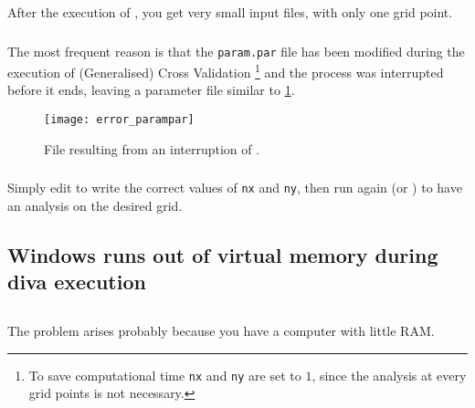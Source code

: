 After the execution of , you get very small input files, with only one grid point.

\subsubsection{\question}

The most frequent reason is that the \texttt{param.par} file has been modified during the execution of (Generalised) Cross Validation \footnote{To save computational time \texttt{nx} and \texttt{ny} are set to $1$, since the analysis at every grid points is not necessary.} and the process was interrupted before it ends, leaving a parameter file similar to \ref{fig:errorparampar}.


\begin{figure}[htpb]
\centering
\texttt{[image: error\_parampar]}
\caption{File  resulting from an interruption of .\label{fig:errorparampar}}
\end{figure}

\subsubsection{\answer}


Simply edit  to write the correct values of \texttt{nx} and \texttt{ny}, then run again  (or ) to have an analysis on the desired grid.






\subsection{Windows runs out of virtual memory during diva execution}




\subsection{\question}

The problem arises probably because you have a computer with little RAM.

